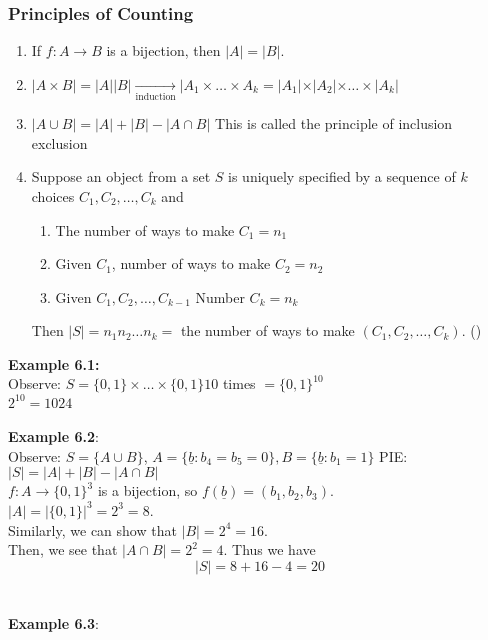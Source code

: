 \documentclass[11pt]{scrartcl}
\begin{document}
\subsubsection{Principles of Counting}
\begin{enumerate}
    \item If $f: A \to B$ is a bijection, then $|A| = |B|$.
    \item $|A \times B| = |A| |B| \xrightarrow[\text{induction}]{} |A_1 \times \dots \times A_k = |A_1| \times |A_2| \times \dots \times |A_k|$
    \item $|A \cup B| = |A| + |B| - |A \cap B|$ This is called the principle of inclusion exclusion 
    \item Suppose an object from a set $S$ is uniquely specified by a sequence of $k$
     choices $C_1, C_2, \dots, C_k$ and \begin{enumerate}
         \item The number of ways to make $C_1 = n_1$  
         \item Given $C_1$, number of ways to make $C_2 = n_2$
         \item Given $C_1, C_2, \dots, C_{k-1}$ Number $C_k = n_k$
     \end{enumerate}
     Then $|S| = n_1 n_2 \dots n_k = $ the number of ways to make $(C_1, C_2, \dots, C_k)$. ()
\end{enumerate}
\textbf{Example 6.1:}\\ \noindent
Observe: $S = \{0, 1\} \times \dots \times \{0, 1\} 10$ times $  =\{0, 1\}^{10}$\\
$2^{10}  = 1024$
\\
\\
\newline \noindent
\textbf{Example 6.2}:\\ \noindent
Observe: $S = \{A \cup B\}$, $A = \{\underline{b}: b_4 = b_5 = 0\}, B = \{\underline{b} : b_1 = 1\}$
PIE: $|S| = |A| + |B| - |A \cap B|$\\ \noindent
$f: A \to \{0, 1\}^3$ is a bijection, so $f(\underline{b}) = (b_1, b_2, b_3)$. \\ \noindent
$|A| = |\{0, 1\}|^3 = 2^3 = 8$.\\
Similarly, we can show that $|B| = 2^4 = 16$.\\
Then, we see that $|A \cap B| = 2^2 = 4$.  Thus we have $$|S| = 8 + 16 - 4 = 20$$
\\
\\
\noindent
\textbf{Example 6.3}: \\ \noindent
\end{document}
